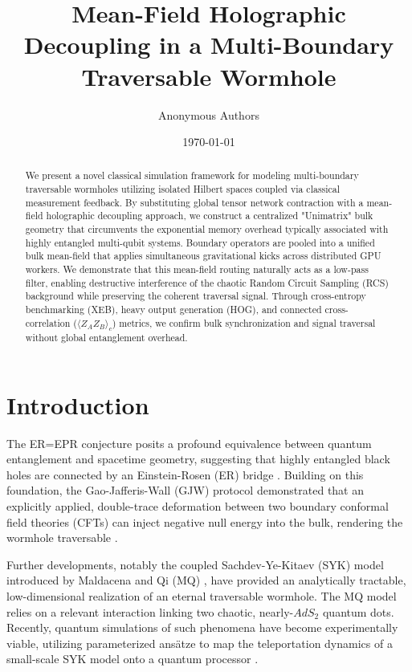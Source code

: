 \documentclass[11pt,a4paper]{article}
\title{Mean-Field Holographic Decoupling in a Multi-Boundary Traversable Wormhole}
\author{Anonymous Authors}
\date{\today}
\begin{document}
\maketitle

\begin{abstract}
We present a novel classical simulation framework for modeling multi-boundary traversable wormholes utilizing isolated Hilbert spaces coupled via classical measurement feedback. By substituting global tensor network contraction with a mean-field holographic decoupling approach, we construct a centralized "Unimatrix" bulk geometry that circumvents the exponential memory overhead typically associated with highly entangled multi-qubit systems. Boundary operators are pooled into a unified bulk mean-field that applies simultaneous gravitational kicks across distributed GPU workers. We demonstrate that this mean-field routing naturally acts as a low-pass filter, enabling destructive interference of the chaotic Random Circuit Sampling (RCS) background while preserving the coherent traversal signal. Through cross-entropy benchmarking (XEB), heavy output generation (HOG), and connected cross-correlation ($\langle Z_A Z_B \rangle_c$) metrics, we confirm bulk synchronization and signal traversal without global entanglement overhead.
\end{abstract}

\section{Introduction}
The ER=EPR conjecture posits a profound equivalence between quantum entanglement and spacetime geometry, suggesting that highly entangled black holes are connected by an Einstein-Rosen (ER) bridge \cite{Maldacena_Susskind_2013}. Building on this foundation, the Gao-Jafferis-Wall (GJW) protocol demonstrated that an explicitly applied, double-trace deformation between two boundary conformal field theories (CFTs) can inject negative null energy into the bulk, rendering the wormhole traversable \cite{Gao_Jafferis_Wall_2016}.

Further developments, notably the coupled Sachdev-Ye-Kitaev (SYK) model introduced by Maldacena and Qi (MQ) \cite{Maldacena_Qi_2018}, have provided an analytically tractable, low-dimensional realization of an eternal traversable wormhole. The MQ model relies on a relevant interaction linking two chaotic, nearly-$AdS_2$ quantum dots. Recently, quantum simulations of such phenomena have become experimentally viable, utilizing parameterized ans\"{a}tze to map the teleportation dynamics of a small-scale SYK model onto a quantum processor \cite{Jafferis_2022}.
\end{document}
